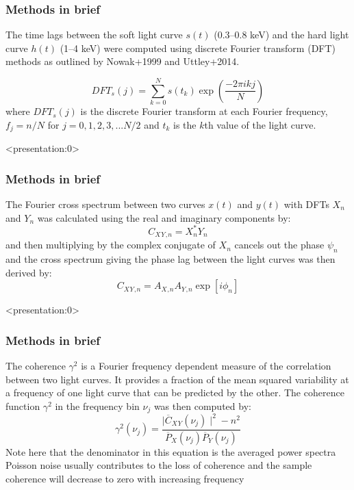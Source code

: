 \documentclass[]{beamer}
\begin{document}
\begin{frame}
\frametitle{Methods in brief}
The time lags between the soft light curve $s(t)$ (0.3--0.8 keV) and the hard light curve $h(t)$ (1--4 keV) were computed using discrete Fourier transform (DFT) methods as outlined by Nowak+1999 and Uttley+2014.

\begin{equation}
DFT_s(j)=\sum_{k=0}^{N}s(t_k) \exp\left(\frac{-2\pi ikj}{N}\right)
\end{equation}
where $DFT_s (j)$ is the discrete Fourier transform at each Fourier frequency, $f_j=n/N$ for $j = 0, 1, 2, 3, ...N/2$ and $t_k$ is the $k$th value of the light curve. 
\end{frame}

\begin{frame}<presentation:0>
\frametitle{Methods in brief}
The Fourier cross spectrum between two curves $x(t)$ and $y(t)$ with DFTs $X_n$ and $Y_n$ was calculated using the real and imaginary components by:
\begin{equation}
C_X{}_Y{}_,{}_n= X_n^*Y_n
\end{equation}
and then multiplying by the complex conjugate of $X_n$ cancels out the phase $\psi_n$ and the cross spectrum giving the phase lag between the light curves was then derived by:
\begin{equation}
C_X{}_Y{}_,{}_n= A_X{}_,{}_n A_Y{}_,{}_n \exp [i\phi_n]
\end{equation}
\end{frame}

\begin{frame}<presentation:0>
\frametitle{Methods in brief}
The coherence $\gamma^2$ is a Fourier frequency dependent measure of the correlation between two light curves. It provides a fraction of the mean squared variability at a frequency of one light curve that can be predicted by the other. The coherence function $\gamma^2$ in the frequency bin $\nu_j$ was then computed by:
\begin{equation}
\gamma^2(\nu_j)=\frac{\mid\overline{C}_X{}_Y(\nu_j)\mid^2-n^2}{\overline{P}_X(\nu_j)\overline{P}_Y(\nu_j)}
\end{equation}
Note here that the denominator in this equation is the averaged power spectra
\vspace{2mm}\\
Poisson noise usually contributes to the loss of coherence and the sample coherence will decrease to zero with increasing frequency 
\end{frame}
\end{document}
